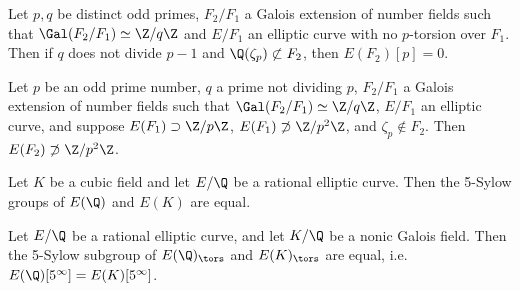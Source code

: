 \begin{frame}[plain,c]
\begin{lem}[Najman, 2015]
Let $p, q$ be distinct odd primes, $F_2/F_1$ a Galois extension of number fields such that $\Gal(F_2/F_1) \simeq \Z/q\Z$ and $E/F_1$ an elliptic curve with no $p$-torsion over $F_1$. Then if $q$ does not divide $p-1$ and $\Q(\zeta_p) \not\subset F_2$, then $E(F_2)[p]=0$. 
\end{lem}


\begin{lem}[Najman, 2015]
Let $p$ be an odd prime number, $q$ a prime not dividing $p$, $F_2/F_1$ a Galois extension of number fields such that $\Gal(F_2/F_1) \simeq \Z/q\Z$, $E/F_1$ an elliptic curve, and suppose $E(F_1) \supset \Z/p\Z$, $E(F_1) \not\supset \Z/p^2\Z$, and $\zeta_p \notin F_2$. Then $E(F_2) \not\supset \Z/p^2\Z$.
\end{lem} 
\end{frame}





\begin{frame}[plain,c]

\begin{lem}[Najman, 2015]
Let $K$ be a cubic field and let $E/\Q$ be a rational elliptic curve. Then the 5-Sylow groups of $E(\Q)$ and $E(K)$ are equal. 
\end{lem}

\begin{lem}[M.]
Let $E/\Q$ be a rational elliptic curve, and let $K/\Q$ be a nonic Galois field. Then the 5-Sylow subgroup of $E(\Q)_\tors$ and $E(K)_\tors$ are equal, i.e. $E(\Q)[5^\infty]= E(K)[5^\infty]$.
\end{lem}

\end{frame}





